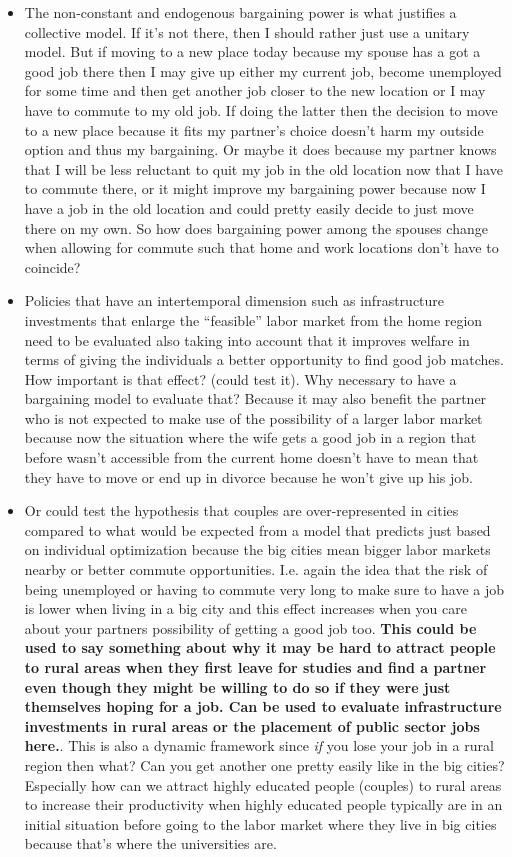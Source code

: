\begin{itemize}
\begin{itemize}
\item The non-constant and endogenous bargaining power is what justifies a collective model. If it's not there, then I should rather just use a unitary model. But if moving to a new place today because my spouse has a got a good job there then I may give up either my current job, become unemployed for some time and then get another job closer to the new location or I may have to commute to my old job. If doing the latter then the decision to move to a new place because it fits my partner's choice doesn't harm my outside option and thus my bargaining. Or maybe it does because my partner knows that I will be less reluctant to quit my job in the old location now that I have to commute there, or it might improve my bargaining power because now I have a job in the old location and could pretty easily decide to just move there on my own. So how does bargaining power among the spouses change when allowing for commute such that home and work locations don't have to coincide?
\item Policies that have an intertemporal dimension such as infrastructure investments that enlarge the ``feasible'' labor market from the home region need to be evaluated also taking into account that it improves welfare in terms of giving the individuals a better opportunity to find good job matches. How important is that effect? (could test it). Why necessary to have a bargaining model to evaluate that? Because it may also benefit the partner who is not expected to make use of the possibility of a larger labor market because now the situation where the wife gets a good job in a region that before wasn't accessible from the current home doesn't have to mean that they have to move or end up in divorce because he won't give up his job.
\item Or could test the hypothesis that couples are over-represented in cities compared to what would be expected from a model that predicts just based on individual optimization because the big cities mean bigger labor markets nearby or better commute opportunities. I.e. again the idea that the risk of being unemployed or having to commute very long to make sure to have a job is lower when living in a big city and this effect increases when you care about your partners possibility of getting a good job too. \textbf{This could be used to say something about why it may be hard to attract people to rural areas when they first leave for studies and find a partner even though they might be willing to do so if they were just themselves hoping for a job. Can be used to evaluate infrastructure investments in rural areas or the placement of public sector jobs here.}. This is also a dynamic framework since \textit{if} you lose your job in a rural region then what? Can you get another one pretty easily like in the big cities? Especially how can we attract highly educated people (couples) to rural areas to increase their productivity when highly educated people typically are in an initial situation before going to the labor market where they live in big cities because that's where the universities are.

\end{itemize}
\end{itemize}
